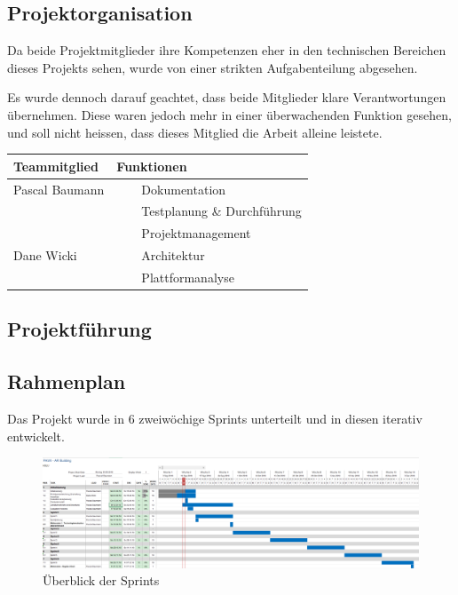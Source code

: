 \documentclass[a4paper]{scrreprt}
\newcommand{\tabitem}{~~\llap{\textbullet}~~}
\begin{document}
\subsection{Projektorganisation}
Da beide Projektmitglieder ihre Kompetenzen eher in den technischen Bereichen dieses Projekts sehen, wurde von einer strikten Aufgabenteilung abgesehen.

Es wurde dennoch darauf geachtet, dass beide Mitglieder klare Verantwortungen übernehmen. Diese waren jedoch mehr in einer überwachenden Funktion gesehen, und soll nicht heissen, dass dieses Mitglied die Arbeit alleine leistete.

\vspace{1em}

\begin{tabularx}{\textwidth}{|X|X|}
	\hline
	\textbf{Teammitglied} & \textbf{Funktionen} \\
	\hline
	Pascal Baumann & \tabitem Dokumentation \\
	& \tabitem Testplanung \& Durchführung \\
	& \tabitem Projektmanagement \\
	\hline
	Dane Wicki & \tabitem Architektur \\
	& \tabitem Plattformanalyse \\
	\hline
\end{tabularx}

\subsection{Projektführung}

\subsection{Rahmenplan}

Das Projekt wurde in 6 zweiwöchige Sprints unterteilt und in diesen iterativ entwickelt.

\vspace{1em}

\begin{figure}
	\includegraphics[keepaspectratio, width=\textwidth]{Rahmenplan}
	\caption{Überblick der Sprints}
\end{figure}
\end{document}

